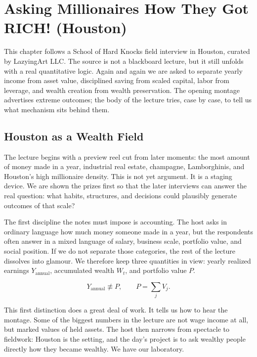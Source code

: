 \chapter{Asking Millionaires How They Got RICH! (Houston)}

This chapter follows a School of Hard Knocks field interview in Houston, curated by LazyingArt LLC. The source is not a blackboard lecture, but it still unfolds with a real quantitative logic. Again and again we are asked to separate yearly income from asset value, disciplined saving from scaled capital, labor from leverage, and wealth creation from wealth preservation. The opening montage advertises extreme outcomes; the body of the lecture tries, case by case, to tell us what mechanism sits behind them.

\section{Houston as a Wealth Field}

The lecture begins with a preview reel cut from later moments: the most amount of money made in a year, industrial real estate, champagne, Lamborghinis, and Houston's high millionaire density. This is not yet argument. It is a staging device. We are shown the prizes first so that the later interviews can answer the real question: what habits, structures, and decisions could plausibly generate outcomes of that scale?

The first discipline the notes must impose is accounting. The host asks in ordinary language how much money someone made in a year, but the respondents often answer in a mixed language of salary, business scale, portfolio value, and social position. If we do not separate those categories, the rest of the lecture dissolves into glamour. We therefore keep three quantities in view: yearly realized earnings \(Y_{\mathrm{annual}}\), accumulated wealth \(W_t\), and portfolio value \(P\).

\begin{equation}
Y_{\mathrm{annual}} \not\equiv P,
\qquad
P = \sum_j V_j.
\end{equation}

This first distinction does a great deal of work. It tells us how to hear the montage. Some of the biggest numbers in the lecture are not wage income at all, but marked values of held assets. The host then narrows from spectacle to fieldwork: Houston is the setting, and the day's project is to ask wealthy people directly how they became wealthy. We have our laboratory.

